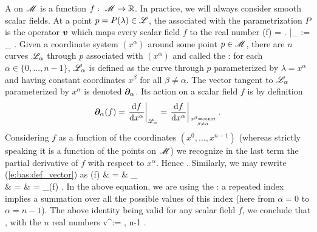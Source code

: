 A  on $\mathscr{M}$ is a function
$f:\ \mathscr{M} \rightarrow \mathbb{R}$. In practice, we will always consider smooth scalar fields. At a point $p=P(\lambda)\in\mathscr{L}$, the  associated with the parametrization
$P$ is the operator $\bm{v}$ which maps every scalar field $f$ to the real number
\be \label{e:bas:def_vector}
  (f) = \left.  \right|_{\Li} :=
  \lim_{\varepsilon{}} 
   .
\ee
Given a coordinate system $(x^\alpha)$ around some point $p\in\mathscr{M}$, there are
$n$ curves $\mathscr{L}_\alpha$ through $p$ associated with $(x^\alpha)$ and called the
:
for each $\alpha\in\{0,\ldots,n-1\}$, $\mathscr{L}_\alpha$ is defined as the curve through $p$ parameterized by $\lambda = x^\alpha$ and having constant coordinates
$x^\beta$ for all $\beta\not=\alpha$.
The vector tangent to $\mathscr{L}_\alpha$ parameterized by $x^\alpha$ is
denoted $\bm{\partial}_\alpha$. Its action on a scalar field $f$ is by definition
\[
  \bm{\partial}_\alpha(f) =
  \left. \frac{\mathrm{d} f}{\mathrm{d} x^\alpha} \right|_{\mathscr{L}_\alpha}
  = \left. \frac{\mathrm{d} f}{\mathrm{d} x^\alpha} \right|_{x^\beta={\rm const}\atop \beta\not=\alpha} .
\]
Considering $f$ as a function of
the coordinates $(x^0,\ldots,x^{n-1})$ (whereas strictly speaking it is a function
of the points on $\mathscr{M}$) we recognize in the last term the partial derivative of
$f$ with respect to $x^\alpha$. Hence
\be \label{e:bas:wpar_partial}
  .
\ee
Similarly, we may rewrite (\ref{e:bas:def_vector}) as
\bea
  (f) & = & \lim_{\varepsilon{}} 
   \nonumber \\
  & = &  
  = \wpar_\alpha(f)  . \nonumber
\eea
In the above equation,
we are using the : a repeated index implies a summation over all the possible values of this index
(here from $\alpha=0$ to $\alpha=n-1$).
The above identity being valid for any scalar field $f$, we conclude that
\be \label{e:bas:v_va_wpar_a}
   ,
\ee
with the $n$ real numbers
\be \label{e:bas:va_dXadlamb}
  v^\alpha :=  ,  \leq \alpha\leq n-1 .
